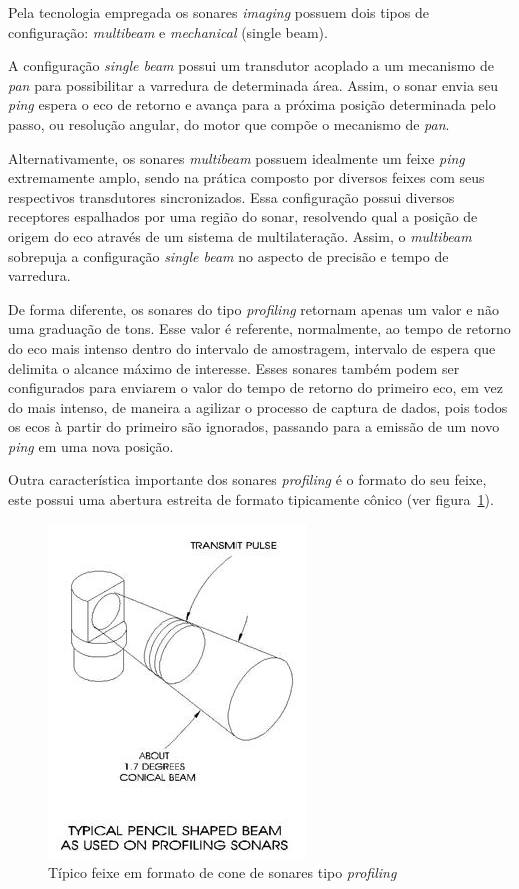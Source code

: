 Pela tecnologia empregada os sonares \emph{imaging} possuem dois tipos de configuração: \emph{multibeam} e \emph{mechanical} (single beam).

A configuração \emph{single beam} possui um transdutor acoplado a um mecanismo de \emph{pan} para possibilitar a varredura de determinada área. Assim, o sonar envia seu \emph{ping} espera o eco de retorno e avança para a próxima posição determinada pelo passo, ou resolução angular, do motor que compõe o mecanismo de \emph{pan}.

Alternativamente, os sonares \emph{multibeam} possuem idealmente um feixe \emph{ping} extremamente amplo, sendo na prática composto por diversos feixes com seus respectivos transdutores sincronizados. Essa configuração possui diversos receptores espalhados por uma região do sonar, resolvendo qual a posição de origem do eco através de um sistema de multilateração. Assim, o \emph{multibeam} sobrepuja a configuração \emph{single beam} no aspecto de precisão e tempo de varredura.

De forma diferente, os sonares do tipo \emph{profiling} retornam apenas um valor e não uma graduação de tons. Esse valor é referente, normalmente, ao tempo de retorno do eco mais intenso dentro do intervalo de amostragem, intervalo de espera que delimita o alcance máximo de interesse. Esses sonares também podem ser configurados para enviarem o valor do tempo de retorno do primeiro eco, em vez do mais intenso, de maneira a agilizar o processo de captura de dados, pois todos os ecos à partir do primeiro são ignorados, passando para a emissão de um novo \emph{ping} em uma nova posição.

Outra característica importante dos sonares \emph{profiling} é o formato do seu feixe, este possui uma abertura estreita de formato tipicamente cônico (ver figura~\ref{sonar_3}).

\begin{figure}[H]
    \centering
    \includegraphics[width=0.5\columnwidth]{figs/sonar/3.jpg}
    \caption{Típico feixe em formato de cone de sonares tipo \emph{profiling}}
    \label{sonar_3}
\end{figure}

